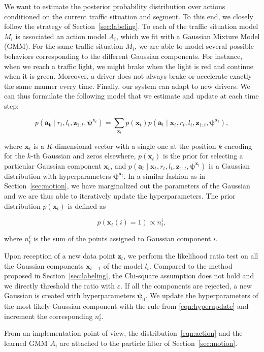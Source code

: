 We want to estimate the posterior probability distribution over actions
conditioned on the current traffic situation and segment. To this end, we
closely follow the strategy of Section~\ref{sec:labeling}. To each of the
traffic situation model $M_i$ is associated an action model $A_i$, which we fit
with a Gaussian Mixture Model (GMM). For the same traffic situation $M_i$, we
are able to model several possible behaviors corresponding to the different
Gaussian components. For instance, when we reach a traffic light, we might brake
when the light is red and continue when it is green. Moreover, a driver does not
always brake or accelerate exactly the same manner every time. Finally, our
system can adapt to new drivers. We can thus formulate the following model that
we estimate and update at each time step:

\begin{equation}
\label{eqn:action}
p(\mathbf{a_t} \mid r_t, l_t,\mathbf{z}_{1:t},\boldsymbol{\psi}^{\mathbf{x}_t})=
\sum_{\mathbf{x}_t} p(\mathbf{x}_t)p(\mathbf{a}_t\mid\mathbf{x}_t,r_t,l_t,
\mathbf{z}_{1:t},\boldsymbol{\psi}^{\mathbf{x}_t}),
\end{equation}

where $\mathbf{x}_t$ is a $K$-dimensional vector with a single one at the
position $k$ encoding for the $k$-th Gaussian and zeros elsewhere,
$p(\mathbf{x}_t)$ is the prior for selecting a particular Gaussian component
$\mathbf{x}_t$, and $p(\mathbf{a}_t\mid\mathbf{x}_t,r_t,l_t,
\mathbf{z}_{1:t},\boldsymbol{\psi}^{\mathbf{x}_t})$ is a Gaussian distribution
with hyperparameters $\boldsymbol{\psi}^{\mathbf{x}_t}$. In a similar fashion as
in Section~\ref{sec:motion}, we have marginalized out the parameters of the
Gaussian and we are thus able to iteratively update the hyperparameters. The
prior distribution $p(\mathbf{x}_t)$ is defined as

\begin{equation}
\label{eqn:gaussianprior}
p(\mathbf{x}_t(i)=1)\propto n_t^i,
\end{equation}

where $n_t^i$ is the sum of the points assigned to Gaussian component $i$.

Upon reception of a new data point $\mathbf{z}_t$, we perform the likelihood
ratio test on all the Gaussian components $\mathbf{x}_{t-1}$ of the model $l_t$.
Compared to the method proposed in Section~\ref{sec:labeling}, the Chi-square
assumption does not hold and we directly threshold the ratio with $\varepsilon$.
If all the components are rejected, a new Gaussian is created with
hyperparameters $\boldsymbol{\psi}_0$. We update the hyperparameters of the most
likely Gaussian component with the rule from \eqref{eqn:hyperupdate} and
increment the corresponding $n_t^i$.

From an implementation point of view, the distribution~\eqref{eqn:action} and
the learned GMM $A_i$ are attached to the particle filter of
Section~\ref{sec:motion}.
